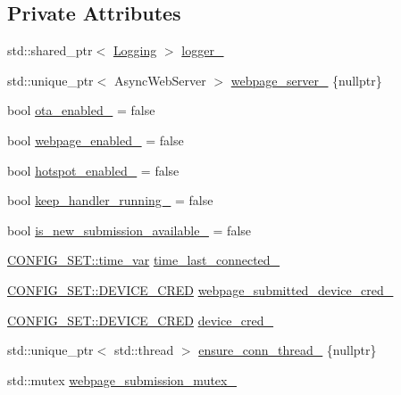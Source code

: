 \subsection*{Private Attributes}
\begin{DoxyCompactItemize}
\item 
std\+::shared\+\_\+ptr$<$ \hyperlink{classLogging}{Logging} $>$ \hyperlink{classConnectivity_abc35eab84d55841433807a011e4fc934}{logger\+\_\+}
\item 
std\+::unique\+\_\+ptr$<$ Async\+Web\+Server $>$ \hyperlink{classConnectivity_a515f9aa8e3c2fae750ea2a6cd40b2d55}{webpage\+\_\+server\+\_\+} \{nullptr\}
\item 
bool \hyperlink{classConnectivity_a2aa5c1cf91cd091b26ddba14545d5dc4}{ota\+\_\+enabled\+\_\+} = false
\item 
bool \hyperlink{classConnectivity_ac43fe86c25a622135065153b1d48fd23}{webpage\+\_\+enabled\+\_\+} = false
\item 
bool \hyperlink{classConnectivity_a66be1641c52bc974aa25d8fd03c71341}{hotspot\+\_\+enabled\+\_\+} = false
\item 
bool \hyperlink{classConnectivity_aa25bae37c163e7126f3817330200f35e}{keep\+\_\+handler\+\_\+running\+\_\+} = false
\item 
bool \hyperlink{classConnectivity_aa8ebaf115b2b8163647231dd7cf5bd4a}{is\+\_\+new\+\_\+submission\+\_\+available\+\_\+} = false
\item 
\hyperlink{namespaceCONFIG__SET_a8816a22e7885d027a52bfa0d24fa9008}{C\+O\+N\+F\+I\+G\+\_\+\+S\+E\+T\+::time\+\_\+var} \hyperlink{classConnectivity_ab09df23ebb472e3c1228cf0fab6617ba}{time\+\_\+last\+\_\+connected\+\_\+}
\item 
\hyperlink{structCONFIG__SET_1_1DEVICE__CRED}{C\+O\+N\+F\+I\+G\+\_\+\+S\+E\+T\+::\+D\+E\+V\+I\+C\+E\+\_\+\+C\+R\+ED} \hyperlink{classConnectivity_a6e95d5e8ad64b301cf95a0df5ddff9a6}{webpage\+\_\+submitted\+\_\+device\+\_\+cred\+\_\+}
\item 
\hyperlink{structCONFIG__SET_1_1DEVICE__CRED}{C\+O\+N\+F\+I\+G\+\_\+\+S\+E\+T\+::\+D\+E\+V\+I\+C\+E\+\_\+\+C\+R\+ED} \hyperlink{classConnectivity_abed78a2ba39529d90841f555a81ef04a}{device\+\_\+cred\+\_\+}
\item 
std\+::unique\+\_\+ptr$<$ std\+::thread $>$ \hyperlink{classConnectivity_afb016a3f11d6d59e9e6feb3869ea5329}{ensure\+\_\+conn\+\_\+thread\+\_\+} \{nullptr\}
\item 
std\+::mutex \hyperlink{classConnectivity_aa0df63a2602190d6db2e7d7352208307}{webpage\+\_\+submission\+\_\+mutex\+\_\+}
\end{DoxyCompactItemize}


